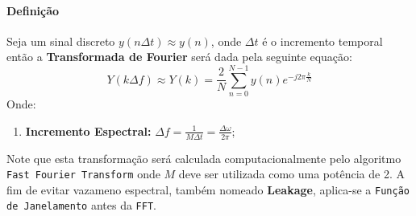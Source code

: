 \documentclass{article}
\begin{document}
            \paragraph{Definição}Seja um sinal discreto $y(n\Delta t) \approx y(n)$, onde $\Delta t$ é o incremento temporal então a \textbf{Transformada de Fourier} será dada pela seguinte equação:
                \begin{equation}
                    \boxed{
                        Y(k\Delta f) \approx Y(k) = \frac{2}{N} \sum_{n=0}^{N-1} y(n) e^{-j2\pi \frac{k}{N}}
                    }
                \end{equation}
            Onde:
                \begin{enumerate}[noitemsep]
                    \item \textbf{Incremento Espectral:} $\Delta f = \frac{1}{M\Delta t} = \frac{\Delta\omega}{2\pi}$;
                \end{enumerate}
            Note que esta transformação será calculada computacionalmente pelo algoritmo \texttt{Fast Fourier Transform} onde $M$ deve ser utilizada como uma potência de 2. A fim de evitar vazameno espectral, também nomeado \textbf{Leakage}, aplica-se a \texttt{Função de Janelamento} antes da \texttt{FFT}.
\end{document}
